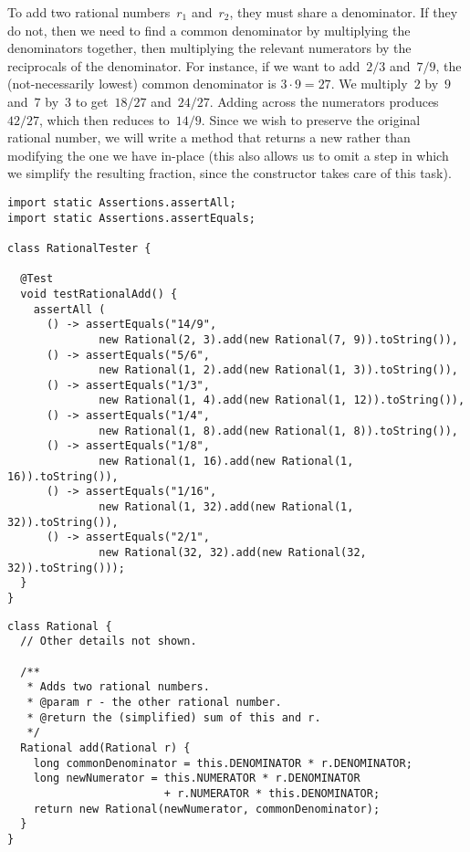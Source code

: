 To add two rational numbers~$r_1$ and~$r_2$, they must share a denominator. 
If they do not, then we need to find a common denominator by multiplying the denominators together, then multiplying the relevant numerators by the reciprocals of the denominator. 
For instance, if we want to add~$2/3$ and~$7/9$, the (not-necessarily lowest) common denominator is $3\cdot{9} = 27$. 
We multiply~$2$ by~$9$ and~$7$ by~$3$ to get~$18/27$ and~$24/27$. 
Adding across the numerators produces~$42/27$, which then reduces to~$14/9$. 
Since we wish to preserve the original rational number, we will write a method that returns a new  rather than modifying the one we have in-place (this also allows us to omit a step in which we simplify the resulting fraction, since the constructor takes care of this task).

\begin{lstlisting}[language=MyJava]
import static Assertions.assertAll;
import static Assertions.assertEquals;

class RationalTester {

  @Test
  void testRationalAdd() {
    assertAll (
      () -> assertEquals("14/9", 
              new Rational(2, 3).add(new Rational(7, 9)).toString()),
      () -> assertEquals("5/6", 
              new Rational(1, 2).add(new Rational(1, 3)).toString()),
      () -> assertEquals("1/3", 
              new Rational(1, 4).add(new Rational(1, 12)).toString()),
      () -> assertEquals("1/4", 
              new Rational(1, 8).add(new Rational(1, 8)).toString()),
      () -> assertEquals("1/8", 
              new Rational(1, 16).add(new Rational(1, 16)).toString()),
      () -> assertEquals("1/16", 
              new Rational(1, 32).add(new Rational(1, 32)).toString()),
      () -> assertEquals("2/1", 
              new Rational(32, 32).add(new Rational(32, 32)).toString()));
  }
}
\end{lstlisting}

\begin{lstlisting}[language=MyJava]
class Rational {
  // Other details not shown.

  /**
   * Adds two rational numbers.
   * @param r - the other rational number.
   * @return the (simplified) sum of this and r.
   */
  Rational add(Rational r) {
    long commonDenominator = this.DENOMINATOR * r.DENOMINATOR;
    long newNumerator = this.NUMERATOR * r.DENOMINATOR 
                        + r.NUMERATOR * this.DENOMINATOR;
    return new Rational(newNumerator, commonDenominator);
  }
}
\end{lstlisting}

